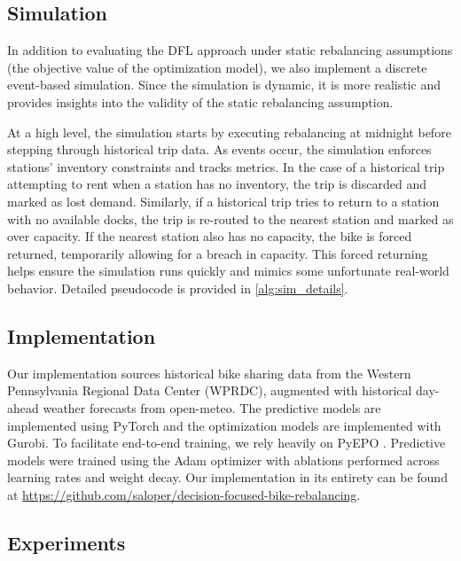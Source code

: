 \documentclass{article}
\begin{document}
\subsection{Simulation}
In addition to evaluating the DFL approach under static rebalancing assumptions (the objective value of the optimization model), we also implement a discrete event-based simulation. Since the simulation is dynamic, it is more realistic and provides insights into
the validity of the static rebalancing assumption. 

At a high level, the simulation starts by executing rebalancing at midnight before stepping through historical trip data. As events occur, the simulation enforces stations' inventory constraints and tracks metrics. 
In the case of a historical trip attempting to rent when a station has no inventory, the trip is discarded and marked as lost demand. Similarly, if a historical trip tries to return to a station with no available docks, the trip is re-routed to the nearest 
station and marked as over capacity. If the nearest station also has no capacity, the bike is forced returned, temporarily allowing for a breach in capacity. This forced returning helps ensure the simulation runs quickly and mimics some unfortunate real-world behavior. 
Detailed pseudocode is provided in \cref{alg:sim_details}.

\subsection{Implementation}
Our implementation sources historical bike sharing data from the Western Pennsylvania Regional Data Center (WPRDC), augmented with historical day-ahead weather forecasts from open-meteo. The predictive models are implemented using PyTorch and the optimization models are implemented
with Gurobi. To facilitate end-to-end training, we rely heavily on PyEPO \cite{tang2024pyeop}. Predictive models were trained using the Adam optimizer with ablations performed across learning rates and weight decay. Our implementation in its entirety can be found at
\url{https://github.com/saloper/decision-focused-bike-rebalancing}.

\subsection{Experiments}
\end{document}
